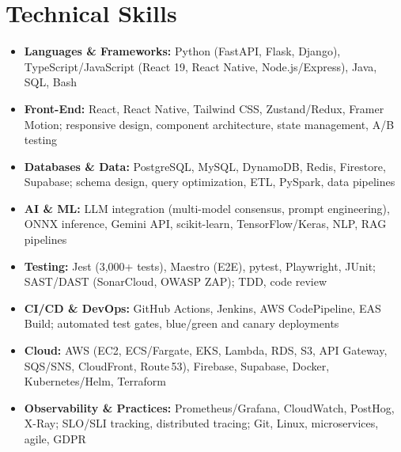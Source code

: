 \documentclass[10pt,a4paper]{article}
\begin{document}
\section*{Technical Skills}
\begin{itemize}
  \item \textbf{Languages \& Frameworks:} Python (FastAPI, Flask, Django), TypeScript/JavaScript (React 19, React Native, Node.js/Express), Java, SQL, Bash
  \item \textbf{Front-End:} React, React Native, Tailwind CSS, Zustand/Redux, Framer Motion; responsive design, component architecture, state management, A/B testing
  \item \textbf{Databases \& Data:} PostgreSQL, MySQL, DynamoDB, Redis, Firestore, Supabase; schema design, query optimization, ETL, PySpark, data pipelines
  \item \textbf{AI \& ML:} LLM integration (multi-model consensus, prompt engineering), ONNX inference, Gemini API, scikit-learn, TensorFlow/Keras, NLP, RAG pipelines
  \item \textbf{Testing:} Jest (3,000+ tests), Maestro (E2E), pytest, Playwright, JUnit; SAST/DAST (SonarCloud, OWASP ZAP); TDD, code review
  \item \textbf{CI/CD \& DevOps:} GitHub Actions, Jenkins, AWS CodePipeline, EAS Build; automated test gates, blue/green and canary deployments
  \item \textbf{Cloud:} AWS (EC2, ECS/Fargate, EKS, Lambda, RDS, S3, API Gateway, SQS/SNS, CloudFront, Route\,53), Firebase, Supabase, Docker, Kubernetes/Helm, Terraform
  \item \textbf{Observability \& Practices:} Prometheus/Grafana, CloudWatch, PostHog, X-Ray; SLO/SLI tracking, distributed tracing; Git, Linux, microservices, agile, GDPR
\end{itemize}
\end{document}
